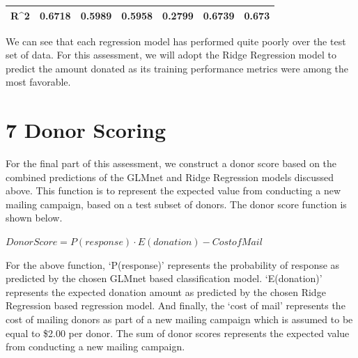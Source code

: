 \documentclass[]{article}
\begin{document}
\begin{longtable}[]{@{}lllllll@{}}
\begin{minipage}[t]{0.11\columnwidth}
R\^{}2\strut
\end{minipage} & \begin{minipage}[t]{0.06\columnwidth}\raggedright\strut
0.6718\strut
\end{minipage} & \begin{minipage}[t]{0.11\columnwidth}\raggedright\strut
0.5989\strut
\end{minipage} & \begin{minipage}[t]{0.15\columnwidth}\raggedright\strut
0.5958\strut
\end{minipage} & \begin{minipage}[t]{0.17\columnwidth}\raggedright\strut
0.2799\strut
\end{minipage} & \begin{minipage}[t]{0.14\columnwidth}\raggedright\strut
0.6739\strut
\end{minipage} & \begin{minipage}[t]{0.06\columnwidth}\raggedright\strut
0.673\strut
\end{minipage}\tabularnewline
\bottomrule
\end{longtable}

We can see that each regression model has performed quite poorly over
the test set of data. For this assessment, we will adopt the Ridge
Regression model to predict the amount donated as its training
performance metrics were among the most favorable.

\section{7 Donor Scoring}\label{donor-scoring}

For the final part of this assessment, we construct a donor score based
on the combined predictions of the GLMnet and Ridge Regression models
discussed above. This function is to represent the expected value from
conducting a new mailing campaign, based on a test subset of donors. The
donor score function is shown below.

\(DonorScore = P(response) \cdot E(donation) - CostofMail\)

For the above function, `P(response)' represents the probability of
response as predicted by the chosen GLMnet based classification model.
`E(donation)' represents the expected donation amount as predicted by
the chosen Ridge Regression based regression model. And finally, the
`cost of mail' represents the cost of mailing donors as part of a new
mailing campaign which is assumed to be equal to \$2.00 per donor. The
sum of donor scores represents the expected value from conducting a new
mailing campaign.
\end{document}
